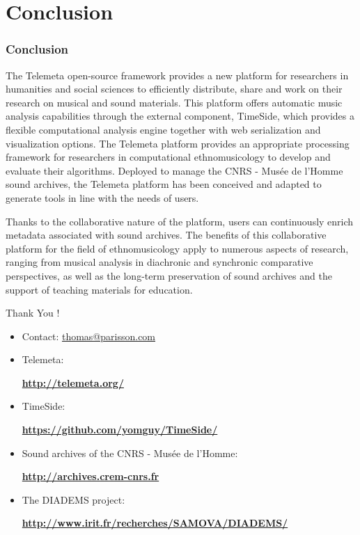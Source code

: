 \documentclass[final, hyperref, table]{beamer}
\begin{document}
\section{Conclusion}
\begin{frame}\frametitle{Conclusion}
  The Telemeta open-source framework provides a new platform for researchers in humanities and social sciences to efficiently distribute, share and work on their research on musical and sound materials. 
This platform offers automatic music analysis capabilities through the external component, TimeSide, which provides a flexible computational analysis engine together with web serialization and visualization options. 
The Telemeta platform provides an appropriate processing framework for researchers in computational ethnomusicology to develop and evaluate their algorithms. 
Deployed to manage the CNRS - Musée de l’Homme sound archives, the Telemeta platform has been conceived and adapted to generate tools in line with the needs of users. 

Thanks to the collaborative nature of the platform, users can continuously enrich metadata associated with sound archives. 
The benefits of this collaborative platform for the field of ethnomusicology apply to numerous aspects of research, ranging from musical analysis in diachronic and synchronic comparative perspectives, as well as the long-term preservation of sound archives and the support of teaching materials for education. 

\end{frame}
\begin{frame}
  Thank You !\\
  \begin{itemize}
  \item Contact: \url{thomas@parisson.com}
  \item Telemeta:
    \begin{center}
      \colorbox{yellow!40}{\textbf{\url{http://telemeta.org/}}}
    \end{center}

  \item TimeSide:
    \begin{center}
      \colorbox{yellow!40}{\bf
        \url{https://github.com/yomguy/TimeSide/}}
    \end{center}

  \item Sound archives of the CNRS - Musée de l’Homme:
    \begin{center}
      \colorbox{yellow!40}{\bf\url{http://archives.crem-cnrs.fr}}
    \end{center}

  \item The DIADEMS project:
    \begin{center}
      \colorbox{yellow!40}{\bf
        \url{http://www.irit.fr/recherches/SAMOVA/DIADEMS/}}
    \end{center}

  \end{itemize}

\end{frame}
\end{document}
